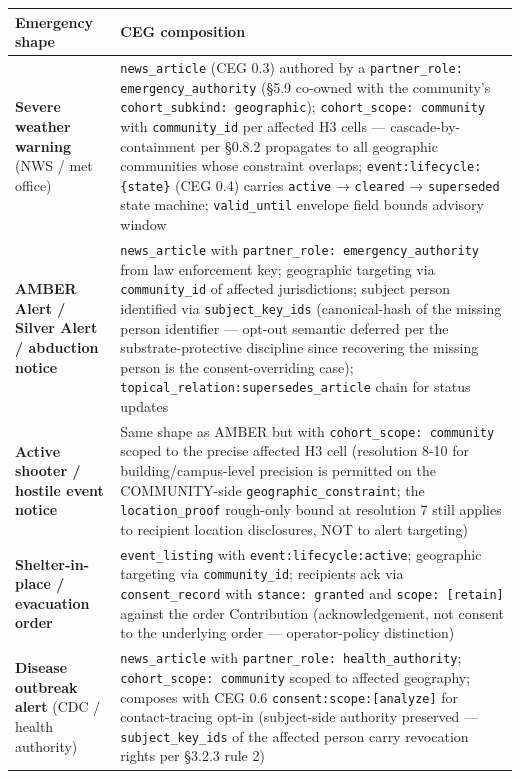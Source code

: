 \documentclass[11pt]{article}
\begin{document}
{\footnotesize
\begin{longtable}{|p{8.0cm}|p{8.0cm}|}\hline
\textbf{Emergency shape} & \textbf{CEG composition} \\ \hline\endhead
\textbf{Severe weather warning} (NWS / met office) & \texttt{news\_article} (CEG 0.3) authored by a \texttt{partner\_role: emergency\_authority} (§5.9 co-owned with the community's \texttt{cohort\_subkind: geographic}); \texttt{cohort\_scope: community} with \texttt{community\_id} per affected H3 cells — cascade-by-containment per §0.8.2 propagates to all geographic communities whose constraint overlaps; \texttt{event:lifecycle:\{state\}} (CEG 0.4) carries \texttt{active} → \texttt{cleared} → \texttt{superseded} state machine; \texttt{valid\_until} envelope field bounds advisory window \\ \hline
\textbf{AMBER Alert / Silver Alert / abduction notice} & \texttt{news\_article} with \texttt{partner\_role: emergency\_authority} from law enforcement key; geographic targeting via \texttt{community\_id} of affected jurisdictions; subject person identified via \texttt{subject\_key\_ids} (canonical-hash of the missing person identifier — opt-out semantic deferred per the substrate-protective discipline since recovering the missing person is the consent-overriding case); \texttt{topical\_relation:supersedes\_article} chain for status updates \\ \hline
\textbf{Active shooter / hostile event notice} & Same shape as AMBER but with \texttt{cohort\_scope: community} scoped to the precise affected H3 cell (resolution 8-10 for building/campus-level precision is permitted on the COMMUNITY-side \texttt{geographic\_constraint}; the \texttt{location\_proof} rough-only bound at resolution 7 still applies to recipient location disclosures, NOT to alert targeting) \\ \hline
\textbf{Shelter-in-place / evacuation order} & \texttt{event\_listing} with \texttt{event:lifecycle:active}; geographic targeting via \texttt{community\_id}; recipients ack via \texttt{consent\_record} with \texttt{stance: granted} and \texttt{scope: [retain]} against the order Contribution (acknowledgement, not consent to the underlying order — operator-policy distinction) \\ \hline
\textbf{Disease outbreak alert} (CDC / health authority) & \texttt{news\_article} with \texttt{partner\_role: health\_authority}; \texttt{cohort\_scope: community} scoped to affected geography; composes with CEG 0.6 \texttt{consent:scope:[analyze]} for contact-tracing opt-in (subject-side authority preserved — \texttt{subject\_key\_ids} of the affected person carry revocation rights per §3.2.3 rule 2) \\ \hline

\end{longtable}}
\end{document}
